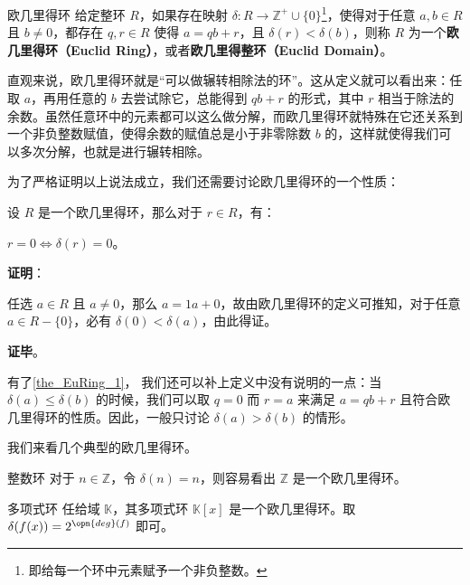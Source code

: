

\begin{definition}{欧几里得环}
给定整环 $R$，如果存在映射 $\delta:R\to\mathbb{Z}^+\cup\{0\}$\footnote{即给每一个环中元素赋予一个非负整数。}，使得对于任意 $a, b\in R$ 且 $b\not=0$，都存在 $q, r\in R$ 使得 $a=qb+r$，且 $\delta(r)<\delta(b)$，则称 $R$ 为一个\textbf{欧几里得环（Euclid Ring）}，或者\textbf{欧几里得整环（Euclid Domain）}。
\end{definition}



直观来说，欧几里得环就是“可以做辗转相除法的环”。这从定义就可以看出来：任取 $a$，再用任意的 $b$ 去尝试除它，总能得到 $qb+r$ 的形式，其中 $r$ 相当于除法的余数。虽然任意环中的元素都可以这么做分解，而欧几里得环就特殊在它还关系到一个非负整数赋值，使得余数的赋值总是小于非零除数 $b$ 的，这样就使得我们可以多次分解，也就是进行辗转相除。

为了严格证明以上说法成立，我们还需要讨论欧几里得环的一个性质：

\begin{theorem}{}\label{the_EuRing_1}
设 $R$ 是一个欧几里得环，那么对于 $r\in R$，有：

$r=0\iff \delta(r)=0$。
\end{theorem}

\textbf{证明}：

任选 $a\in R$ 且 $a\not=0$，那么 $a=1a+0$，故由欧几里得环的定义可推知，对于任意 $a\in R-\{0\}$，必有 $\delta(0)<\delta(a)$，由此得证。

\textbf{证毕}。

有了\autoref{the_EuRing_1}， 我们还可以补上定义中没有说明的一点：当 $\delta(a)\leq\delta(b)$ 的时候，我们可以取 $q=0$ 而 $r=a$ 来满足 $a=qb+r$ 且符合欧几里得环的性质。因此，一般只讨论 $\delta(a)>\delta(b)$ 的情形。

我们来看几个典型的欧几里得环。

\begin{example}{整数环}
对于 $n\in\mathbb{Z}$，令 $\delta(n)=n$，则容易看出 $\mathbb{Z}$ 是一个欧几里得环。
\end{example}

\begin{example}{多项式环}
任给域 $\mathbb{K}$，其多项式环 $\mathbb{K}[x]$ 是一个欧几里得环。取 $\delta(f(x))=2^{\opn{deg}(f)}$ 即可。
\end{example}

